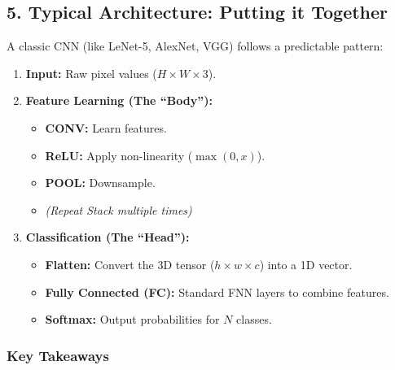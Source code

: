 \documentclass[
  italian,
  11pt,
]{article}
\begin{document}
\subsection{5. Typical Architecture: Putting it
Together}\label{typical-architecture-putting-it-together}

A classic CNN (like LeNet-5, AlexNet, VGG) follows a predictable
pattern:

\begin{enumerate}
\def\labelenumi{\arabic{enumi}.}
\item
  \textbf{Input:} Raw pixel values (\(H \times W \times 3\)).
\item
  \textbf{Feature Learning (The ``Body''):}

  \begin{itemize}
  \item
    \textbf{CONV:} Learn features.
  \item
    \textbf{ReLU:} Apply non-linearity (\(\max(0, x)\)).
  \item
    \textbf{POOL:} Downsample.
  \item
    \emph{(Repeat Stack multiple times)}
  \end{itemize}
\item
  \textbf{Classification (The ``Head''):}

  \begin{itemize}
  \item
    \textbf{Flatten:} Convert the 3D tensor (\(h \times w \times c\))
    into a 1D vector.
  \item
    \textbf{Fully Connected (FC):} Standard FNN layers to combine
    features.
  \item
    \textbf{Softmax:} Output probabilities for \(N\) classes.
  \end{itemize}
\end{enumerate}

\subsubsection{Key Takeaways}\label{key-takeaways-23}
\end{document}
